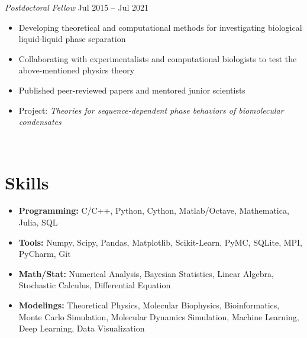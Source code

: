 \documentclass[11pt]{../yhlcv}
\begin{document}
{\it Postdoctoral Fellow} \hfill Jul 2015 -- Jul 2021\vspace{-0.5em}\\
\begin{itemize}[leftmargin=*]\itemsep-0.2em
\item Developing theoretical and computational methods for investigating biological liquid-liquid phase separation
\item Collaborating with experimentalists and computational biologists to test the above-mentioned physics theory
\item Published peer-reviewed papers and mentored junior scientists 
\item Project: {\it Theories for sequence-dependent phase behaviors of biomolecular condensates}
\end{itemize}

~\vspace{-3em}\\

\section*{Skills}
\begin{itemize}[leftmargin=*]\itemsep-0.1em
%
\item{\bf Programming:} 
C/C++, Python, Cython, Matlab/Octave, Mathematica, Julia, SQL
%
\item{\bf Tools:}
Numpy, Scipy, Pandas, Matplotlib, Scikit-Learn, PyMC, SQLite, MPI, PyCharm, Git

%
\item {\bf Math/Stat:}
Numerical Analysis, 
Bayesian Statistics, 
Linear Algebra, 
Stochastic Calculus,
Differential Equation
\item{\bf Modelings:}
Theoretical Physics, Molecular Biophysics, Bioinformatics,
Monte Carlo Simulation, Molecular Dynamics Simulation, %
Machine Learning,
Deep Learning, %
Data Visualization
%
\end{itemize}
\end{document}
